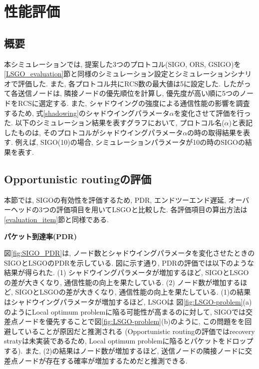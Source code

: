 \documentclass[10pt]{jreport}
\begin{document}
\chapter{性能評価}
\section{概要}
本シミュレーションでは, 提案した3つのプロトコル(SIGO, ORS, GSIGO)を\ref{LSGO_evaluation}節と同様のシミュレーション設定とシミュレーションシナリオで評価した. また, 各プロトコル共にRCS数の最大値は5に設定した. したがって各送信ノードは, 隣接ノードの優先順位を計算し, 優先度が高い順に5つのノードをRCSに選定する. また, シャドウイングの強度による通信性能の影響を調査するため, 式\ref{shadowing}のシャドウイングパラメータ$\alpha$を変化させて評価を行った. 以下のシミュレーション結果を表すグラフにおいて, プロトコル名($\alpha$)と表記したものは, そのプロトコルがシャドウイングパラメータ$\alpha$の時の取得結果を表す. 
例えば, SIGO(10)の場合, シミュレーションパラメータが10の時のSIGOの結果を表す.

\section{Opportunistic routingの評価}
\label{SIGO_evaluation}
本節では, SIGOの有効性を評価するため, PDR, エンドツーエンド遅延, オーバーヘッドの3つの評価項目を用いてLSGOと比較した.
各評価項目の算出方法は\ref{evaluation_item}節と同様である.

\par
\vspace{5mm}
\noindent
\textbf{パケット到達率(PDR)}
\vspace{5mm}

図\ref{fig:SIGO_PDR}は, ノード数とシャドウイングパラメータを変化させたときのSIGOとLSGOのPDRを示している.
図に示す通り, PDRの評価では以下のような結果が得られた.
(1) シャドウイングパラメータが増加するほど, SIGOとLSGOの差が大きくなり, 通信性能の向上を果たしている.
(2) ノード数が増加するほど, SIGOとLSGOの差が大きくなり, 通信性能の向上を果たしている.
(1)の結果はシャドウイングパラメータが増加するほど, LSGOは 図\ref{fig:LSGO-problem}(a)のようにLocal optimum problemに陥る可能性が高まるのに対して, SIGOでは交差点ノードを優先することで図\ref{fig:LSGO-problem}(b)のように, この問題をを回避していることが原因だと推測される (Opportunistic routingの評価ではrecovery stratyは未実装であるため, Local optimum problemに陥るとパケットをドロップする).
また, (2)の結果はノード数が増加するほど, 送信ノードの隣接ノードに交差点ノードが存在する確率が増加するためだと推測できる.
\end{document}
